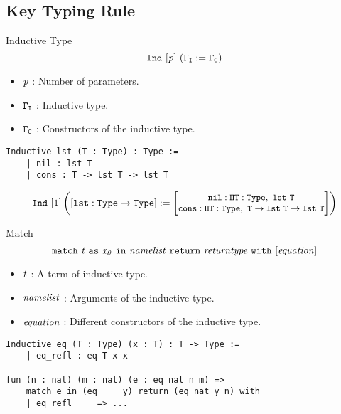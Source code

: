 \documentclass[UTF-8]{beamer}
\begin{document}
\subsection{Key Typing Rule}
\begin{frame}[fragile]{Inductive Type}
$$
\tt Ind\ [{\it p}]\ (\Gamma_I:=\Gamma_C)
$$
\vspace{-10pt}
\begin{itemize}
\item $\it p$ : Number of parameters.
\item $\tt \Gamma_I$ : Inductive type.
\item $\tt \Gamma_C$ : Constructors of the inductive type.
\end{itemize}
\vspace{10pt}
\begin{verbatim}
Inductive lst (T : Type) : Type :=
    | nil : lst T
    | cons : T -> lst T -> lst T
\end{verbatim}
$$
\small
\tt Ind\ [1]\left([lst:Type\to Type]:=
\begin{bmatrix}
\tt nil:\Pi T:Type,\ lst\ T\\
\tt cons:\Pi T:Type,\ T\to lst\ T\to lst\ T
\end{bmatrix}\right)
$$
\end{frame}

\begin{frame}[fragile]{Match}
$$\tt match\ {\it t}\ as\ {\it x_0}\ in\ {\it namelist}\ return\ {\it returntype}\ with\ [{\it equation}]$$
\begin{itemize}
    \item $\it t$ : A term of inductive type.
    \item $\it namelist$ : Arguments of the inductive type.
    \item $\it equation$ : Different constructors of the inductive type.
\end{itemize}

\begin{verbatim}
Inductive eq (T : Type) (x : T) : T -> Type :=
    | eq_refl : eq T x x

fun (n : nat) (m : nat) (e : eq nat n m) =>
    match e in (eq _ _ y) return (eq nat y n) with
    | eq_refl _ _ => ...
\end{verbatim}
\end{frame}
\end{document}
